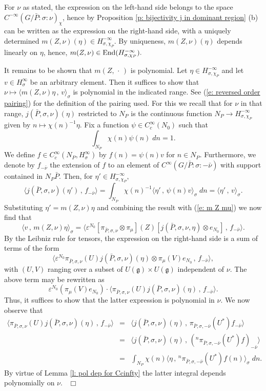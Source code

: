 \documentclass[12pt,a4paper]{article}
\def\proof{\par\noindent{\it Proof.}{\ }{\ }}
\def\qed{~\hfill\hbox{$\Box$}\medbreak}
\def\ge{\varepsilon}
\def\gs{\sigma}
\def\got#1{\mathfrak #1}
\def\fg{{\got g}}
\def\to{\rightarrow}
\def\inp#1#2{\langle#1\,,\,#2\rangle}
\def\End{{\rm End}}
\numberwithin{Thm}{section}
\numberwithin{equation}{section}
\def\dotvar{\, \cdot\,}
\numberwithin{equation}{section}
\def\cchi{\chi}
\begin{document}
\proof
For $\nu$ as stated, the expression on the left-hand side belongs
to the space $C^{-\infty}(G/\bar P: \gs:\nu)_\cchi$, hence by Proposition 
\ref{p: bijectivity j in dominant region} (b) can be written as
the expression on the right-hand side, with a uniquely determined 
$m(Z, \nu)(\eta) \in H_{\gs,\cchi_P}^{-\infty}.$ By uniqueness, $m(Z, \nu)(\eta)$ 
depends linearly on $\eta$, hence, $m(Z, \nu) \in \End(H_{\gs,\cchi_P}^{-\infty}).$ 

It remains to be shown that $m(Z,\dotvar )$ is polynomial. Let $\eta \in H_{\gs,\cchi_P}^{-\infty}$ and let 
$v \in H_\gs^\infty$ be an arbitrary element. Then it suffices to show that
$\nu \mapsto \inp{m(Z,\nu)\eta}{v}_\gs$ is polynomial in the indicated range.
See (\ref{e: reversed order pairing}) for the definition of the pairing used.
For this we recall that for $\nu$ in that range,  $j(\bar P, \gs, \nu)(\eta)$ 
restricted to $N_P$ is the continuous function $N_P\to H_{\gs, \cchi_P}^{-\infty}$ 
given by $n \mapsto \cchi(n)^{-1}  \eta.$ Fix a function $\psi \in C^{\infty}_c(N_0)$ such that
$$ 
\int_{N_P} {\cchi(n)} \psi(n) \; dn = 1.
$$ 
We define $f  \in C_c^\infty(N_P, H_\gs^\infty) $ 
by 
$f(n) = \psi(n) v$ for $n \in N_P.$ Furthermore, we denote by $f_{-\bar \nu}$ the extension 
of $f$ to an element of $C^\infty(G/\bar P: \gs: -\bar \nu)$ with support contained in $N_P \bar P.$ 
Then, for $\eta' \in H_{\gs,\cchi_P}^{-\infty},$ 
$$ 
\inp{j(\bar P, \gs ,\nu)(\eta' )}{f_{-\bar \nu}} = 
\int_{N_P}  \cchi(n)^{-1} \inp{\eta'}{\psi(n) v}_\gs \; dn = \inp{\eta'}{v}_\gs.
$$ 
Substituting $\eta' = m(Z, \nu) \eta$ and combining the result with (\ref{e: m Z mu})
we now find that
$$ 
\inp{v}{m(Z, \nu)\eta}_\gs= 
\inp{\ge^{N_0} [\pi_{\bar P, \gs, \nu}  \otimes \pi_\mu](Z)
 [j(\bar P, \gs,\nu, \eta) \otimes e_{N_0}]}{f_{-\bar \nu}}.
 $$%
By the Leibniz rule for tensors, the expression on the right-hand side is a sum of terms of the form
$$ 
\inp{\ge^{N_0} \pi_{\bar P, \gs, \nu}(U)  j(\bar P, \gs, \nu)( \eta) \otimes \pi_\mu (V)e_{N_0} } {f_{-\bar \nu}},
$$%
with $(U,V)$ ranging over a subset of $U(\fg)\times U(\fg)$ independent of $\nu.$ The above term 
may be rewritten as
$$ 
\ge^{N_0}(\pi_\mu(V) e_{N_0}) \cdot \inp{\pi_{\bar P, \gs, \nu}(U) j(\bar P, \gs, \nu)( \eta)}{f_{-\bar \nu}}.
$$%
Thus, it suffices to show that the latter expression is polynomial in $\nu.$ 
We now observe that 
\begin{eqnarray*}
\inp{\pi_{\bar P, \gs, \nu}(U) j(\bar P,\gs,\nu)( \eta)}{f_{-\bar\nu}}&=& 
\inp{ j(\bar P, \gs, \nu)( \eta)}{\pi_{\bar P, \gs, -\bar \nu}(U^*)f_{-\bar\nu} }\\
&=& 
\inp{ j(\bar P,\gs, \nu)( \eta)} {({}^n \pi_{\bar P, \gs, -\bar \nu}(U^*)f)_{-\bar\nu} }\\
&=& 
\int_{N_P} \cchi(n)  \inp{\eta}{{}^n \pi_{\bar P, \gs, -\bar \nu}(U^*)f (n)}_\gs \; dn.
\end{eqnarray*}
By virtue of Lemma \ref{l: pol dep for Ccinfty} 
 the latter integral depends polynomially on $\nu.$ 
\qed
\end{document}
